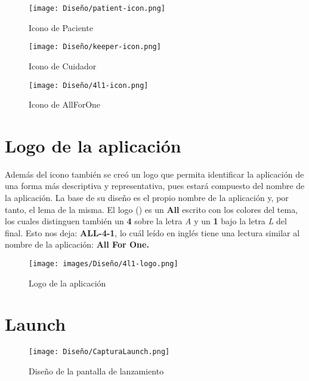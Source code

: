 \vspace{30pt}
\begin{figure}[H]
    \centering
    \begin{minipage}{0.25\textwidth}
        \centering
        \texttt{[image: Diseño/patient-icon.png]}
        \caption{Icono de Paciente}
        \label{fig:patient_icon}
    \end{minipage}\hfill
    \begin{minipage}{0.25\textwidth}
        \centering
        \texttt{[image: Diseño/keeper-icon.png]}
        \caption{Icono de Cuidador}
        \label{fig:keeper_icon}
    \end{minipage}\hfill
    \begin{minipage}{0.25\textwidth}
        \centering
        \texttt{[image: Diseño/4l1-icon.png]}
        \caption{Icono de AllForOne}
        \label{fig:app_icon}
    \end{minipage}
\end{figure}

\section{Logo de la aplicación}

Además del icono también se creó un logo que permita identificar la aplicación de una forma más descriptiva y representativa, pues estará compuesto del nombre de la aplicación. La base de su diseño es el propio nombre de la aplicación y, por tanto, el lema de la misma. El logo () es un \textbf{All} escrito con los colores del tema, los cuales distinguen también un \textbf{4} sobre la letra \emph{A} y un \textbf{1} bajo la letra \emph{L} del final. Esto nos deja: \textbf{ALL-4-1}, lo cuál leído en inglés tiene una lectura similar al nombre de la aplicación: \textbf{All For One.}

\begin{figure}[H]
    \centering
    \texttt{[image: images/Diseño/4l1-logo.png]}
    \caption{Logo de la aplicación}
    \label{fig:app_logo}
\end{figure}

\section{Launch}

\begin{figure}[H]
    \centering
    \texttt{[image: Diseño/CapturaLaunch.png]}
    \caption{Diseño de la pantalla de lanzamiento}
    \label{scr:launch}
\end{figure}

